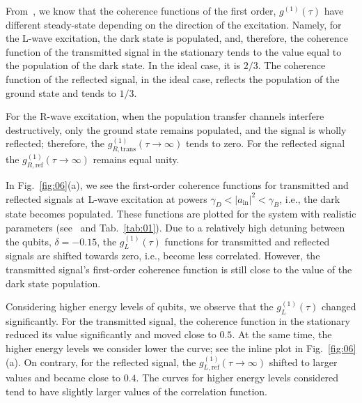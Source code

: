 \documentclass[lettersize,journal]{IEEEtran}
\begin{document}
From~\cite{muller_nonreciprocal_2017}, we know that the coherence functions of the first order, $g^{(1)}(\tau)$ have different steady-state depending on the direction of the excitation.
Namely, for the L-wave excitation, the dark state is populated, and, therefore, the coherence function of the transmitted signal in the stationary tends to the value equal to the population of the dark state.
In the ideal case, it is $2/3$.
The coherence function of the reflected signal, in the ideal case, reflects the population of the ground state and tends to $1/3$.

For the R-wave excitation, when the population transfer channels interfere destructively, only the ground state remains populated, and the signal is wholly reflected; therefore, the $g^{(1)}_{R, \mathrm{trans}}(\tau \rightarrow \infty)$ tends to zero.
For the reflected signal the $g^{(1)}_{R, \mathrm{ref}}(\tau \rightarrow \infty)$ remains equal unity.

In Fig.~\ref{fig:06}(a), we see the first-order coherence functions for transmitted and reflected signals at L-wave excitation at powers $\gamma_D < |a_\mathrm{in}|^2 < \gamma_B$, i.e., the dark state becomes populated.
These functions are plotted for the system with realistic parameters (see~\cite{rosario_hamann_nonreciprocity_2018} and Tab.~\ref{tab:01}).
Due to a relatively high detuning between the qubits, $\delta = - 0.15$, the $g^{(1)}_L(\tau)$ functions for transmitted and reflected signals are shifted towards zero, i.e., become less correlated.
However, the transmitted signal's first-order coherence function is still close to the value of the dark state population.

Considering higher energy levels of qubits, we observe that the $g^{(1)}_L(\tau)$ changed significantly.
For the transmitted signal, the coherence function in the stationary reduced its value significantly and moved close to $0.5$.
At the same time, the higher energy levels we consider lower the curve; see the inline plot in Fig.~\ref{fig:06}(a).
On contrary, for the reflected signal, the $g^{(1)}_{L, \mathrm{ref}}(\tau \rightarrow \infty)$ shifted to larger values and became close to $0.4$.
The curves for higher energy levels considered tend to have slightly larger values of the correlation function.
\end{document}
